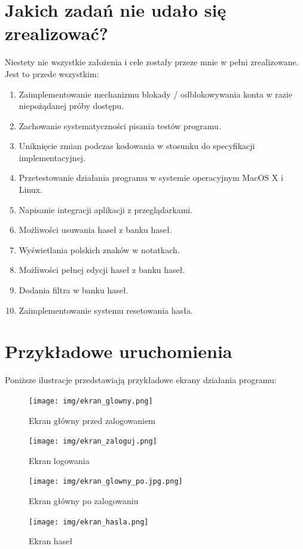 \documentclass[a4paper]{article}
\begin{document}
\section{Jakich zadań nie udało się zrealizować?}
Niestety nie wszystkie założenia i cele zostały przeze mnie w pełni zrealizowane. Jest to przede wszystkim:
\begin{enumerate}
    \item Zaimplementowanie mechanizmu blokady / odblokowywania konta w razie niepożądanej próby dostępu.
    \item Zachowanie systematyczności pisania testów programu.
    \item Uniknięcie zmian podczas kodowania w stosunku do specyfikacji implementacyjnej.
    \item Przetestowanie działania programu w systemie operacyjnym MacOS X i Linux.
    \item Napisanie integracji aplikacji z przeglądarkami.
    \item Możliwości usuwania haseł z banku haseł.
    \item Wyświetlania polskich znaków w notatkach.
    \item Możliwości pełnej edycji haseł z banku haseł.
    \item Dodania filtra w banku haseł.
    \item Zaimplementowanie systemu resetowania hasła.
\end{enumerate}
\newpage
\section{Przykładowe uruchomienia}
Poniższe ilustracje przedstawiają przykładowe ekrany działania programu:
\begin{figure}[H]
    \centering
    \texttt{[image: img/ekran\_glowny.png]}
    \caption{Ekran główny przed zalogowaniem}
\end{figure}

\begin{figure}[H]
    \centering
    \texttt{[image: img/ekran\_zaloguj.png]}
    \caption{Ekran logowania}
\end{figure}

\begin{figure}[H]
    \centering
    \texttt{[image: img/ekran\_glowny\_po.jpg.png]}
    \caption{Ekran główny po zalogowaniu}
\end{figure}

\begin{figure}[H]
    \centering
    \texttt{[image: img/ekran\_hasla.png]}
    \caption{Ekran haseł}
\end{figure}
\end{document}

